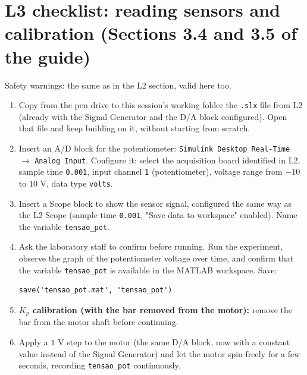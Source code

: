 \documentclass[a4paper,11pt]{article}
\begin{document}
\section*{L3 checklist: reading sensors and calibration (Sections 3.4 and 3.5 of
the guide)}

Safety warnings: the same as in the L2 section, valid here too.

\begin{enumerate}[label=$\square$, leftmargin=1.5em]
  \item Copy from the pen drive to this session's working folder the \texttt{.slx}
  file from L2 (already with the Signal Generator and the D/A block configured).
  Open that file and keep building on it, without starting from scratch.

  \item Insert an A/D block for the potentiometer: \texttt{Simulink Desktop
  Real-Time} $\to$ \texttt{Analog Input}. Configure it: select the acquisition
  board identified in L2, sample time \texttt{0.001}, input channel \texttt{1}
  (potentiometer), voltage range from $-10$ to $10$ V, data type \texttt{volts}.

  \item Insert a Scope block to show the sensor signal, configured the same way as
  the L2 Scope (sample time \texttt{0.001}, "Save data to workspace" enabled).
  Name the variable \texttt{tensao\_pot}.

  \item Ask the laboratory staff to confirm before running. Run the experiment,
  observe the graph of the potentiometer voltage over time, and confirm that the
  variable \texttt{tensao\_pot} is available in the MATLAB workspace. Save:
  \begin{verbatim}
save('tensao_pot.mat', 'tensao_pot')
  \end{verbatim}

  \item \textbf{$K_p$ calibration (with the bar removed from the motor):} remove
  the bar from the motor shaft before continuing.

  \item Apply a $1$ V step to the motor (the same D/A block, now with a constant
  value instead of the Signal Generator) and let the motor spin freely for a few
  seconds, recording \texttt{tensao\_pot} continuously.


\end{enumerate}
\end{document}

